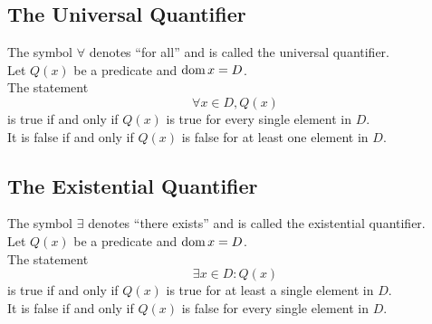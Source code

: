 \documentclass{report}
\begin{document}
\subsection*{The Universal Quantifier}
The symbol $\forall$ denotes ``for all'' and is called the universal quantifier.\\

Let $Q(x)$ be a predicate and $\operatorname{dom} x = D$.\\
The statement 
$$
	\forall x\in D, Q(x)
$$
is true if and only if $Q(x)$ is true for every single element in $D$.\\
It is false if and only if $Q(x)$ is false for at least one element in $D$.


\subsection*{The Existential Quantifier}
The symbol $\exists$ denotes ``there exists'' and is called the existential quantifier.\\

Let $Q(x)$ be a predicate and $\operatorname{dom} x = D$.\\
The statement 
$$
	\exists x\in D: Q(x)
$$
is true if and only if $Q(x)$ is true for at least a single element in $D$.\\
It is false if and only if $Q(x)$ is false for every single element in $D$.
\end{document}
